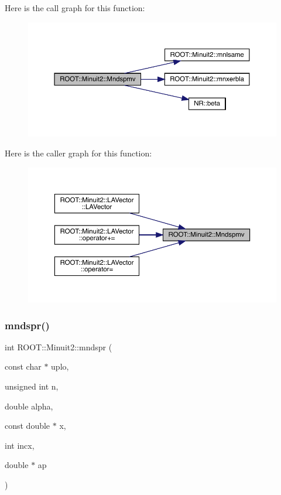 Here is the call graph for this function\+:
\nopagebreak
\begin{figure}[H]
\begin{center}
\leavevmode
\includegraphics[width=350pt]{d6/d3a/namespaceROOT_1_1Minuit2_ad193f5f7fa4c96ebf1fe98c72ab22ca2_cgraph}
\end{center}
\end{figure}
Here is the caller graph for this function\+:
\nopagebreak
\begin{figure}[H]
\begin{center}
\leavevmode
\includegraphics[width=350pt]{d6/d3a/namespaceROOT_1_1Minuit2_ad193f5f7fa4c96ebf1fe98c72ab22ca2_icgraph}
\end{center}
\end{figure}
\mbox{\label{namespaceROOT_1_1Minuit2_acc89c3c759da8dc191d0a862e354a555}} 
\subsubsection{\texorpdfstring{mndspr()}{mndspr()}}
{\footnotesize\ttfamily int R\+O\+O\+T\+::\+Minuit2\+::mndspr (\begin{DoxyParamCaption}\item[{const char $\ast$}]{uplo,  }\item[{unsigned int}]{n,  }\item[{double}]{alpha,  }\item[{const double $\ast$}]{x,  }\item[{int}]{incx,  }\item[{double $\ast$}]{ap }\end{DoxyParamCaption})}

